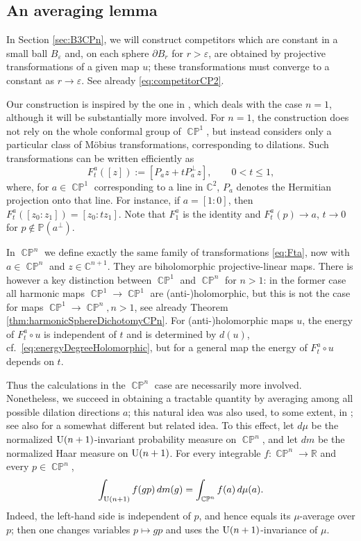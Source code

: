\documentclass[11pt]{article}
\theoremstyle{plain}
\numberwithin{equation}{section}
\theoremstyle{definition}
\def \R {\mathbb{R}}
\def \C{\mathbb{C}}
\def \e{\varepsilon}
\def \mb{\mathbb}
\def \tp{\textup}
\DeclareMathOperator{\CP}{\mathbb{CP}}
\begin{document}
\subsection{An averaging lemma}

In Section \ref{sec:B3CPn}, we will construct competitors which are constant in a small ball $B_\e$ and, on each sphere
$\partial B_r$ for $r>\e$, are obtained by projective transformations of a
given map $u$; these transformations must converge to a constant as
$r\to\e$. See already \eqref{eq:competitorCP2}.

Our construction is inspired by the one in  \cite[Theorem 7.4]{Brezis1986}, which deals with the case $n=1$, although it will be substantially more involved. For $n=1$, the construction does not rely on the whole conformal
group of $\CP^1$, but instead considers only a particular class of M\"obius
transformations, corresponding to dilations.  Such transformations can be
written efficiently as
\begin{equation}
\label{eq:Fta}
    F_t^a([z]):=[P_az+tP_a^\perp z], \qquad 0<t\leq 1,
\end{equation}
where, for $a\in\CP^1$ corresponding to a line in $\C^2$, $P_a$ denotes the
Hermitian projection onto that line.  For instance, if $a=[1:0]$, then
$F_t^a([z_0:z_1])=[z_0:tz_1]$. Note that $F_1^a$ is the identity and
$F_t^a(p)\to a$, $t\rightarrow 0$ for $p \notin \mb P(a^\perp)$.

In $\CP^n$ we define exactly the same family of transformations
\eqref{eq:Fta}, now with $a\in\CP^n$ and $z\in\C^{n+1}$.  They are
biholomorphic projective-linear maps.  There is however a key distinction between $\CP^1$ and $\CP^n$ for $n>1$: in the former case all harmonic maps $\CP^1\to \CP^1$ are (anti-)holomorphic, but this is not the case for maps $\CP^1\to \CP^n, n>1$, see already Theorem \ref{thm:harmonicSphereDichotomyCPn}. For (anti-)holomorphic maps $u$, the energy of $F_t^a\circ u$ is independent of $t$ and is determined by  $d(u)$, cf.\ \eqref{eq:energyDegreeHolomorphic}, but for a general map the energy of $F_t^a \circ u$ depends on $t$.

Thus the calculations in the $\CP^n$ case are necessarily more involved.
Nonetheless, we succeed in obtaining a
tractable quantity by averaging among all possible dilation directions $a$; this natural idea was also used, to some extent, in \cite{Brezis1986}; see also \cite[Lemma 1.2]{Coron1989} for a somewhat different but related idea.
To this effect, let $d\mu$ be the normalized $\tp{U}(n+1)$-invariant
probability measure on $\CP^n$, and let $dm$ be the normalized Haar measure on
$\tp{U}(n+1)$.  For every integrable
$f\colon\CP^n\to\R$ and every $p\in\CP^n$,
\begin{equation}
\label{eq:Unavg}
    \int_{\tp{U}(n+1)}f(gp)\,dm(g)
    =\int_{\CP^n}f(a)\,d\mu(a).
\end{equation}
Indeed, the left-hand side is independent of $p$, and hence equals its
$\mu$-average over $p$; then one changes variables $p\mapsto gp$ and uses the
$\tp{U}(n+1)$-invariance of $\mu$.
\end{document}
